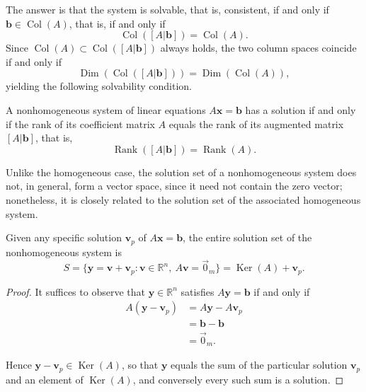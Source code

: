 The answer is that the system is solvable, that is, consistent, if and only if $\mathbf{b} \in \operatorname{Col}(A)$, that is, if and only if
\[
\operatorname{Col}([A|\mathbf{b}]) = \operatorname{Col}(A).
\]
Since $\operatorname{Col}(A) \subset \operatorname{Col}([A|\mathbf{b}])$ always holds, the two column spaces coincide if and only if
\[
\operatorname{Dim}(\operatorname{Col}([A|\mathbf{b}])) = \operatorname{Dim}(\operatorname{Col}(A)),
\]
yielding the following solvability condition.

\begin{theorem}
A nonhomogeneous system of linear equations $A\mathbf{x} = \mathbf{b}$ has a solution if and only if the rank of its coefficient matrix $A$ equals the rank of its augmented matrix $[A|\mathbf{b}]$, that is,
\[
\operatorname{Rank}([A|\mathbf{b}]) = \operatorname{Rank}(A).
\]

\end{theorem}

Unlike the homogeneous case, the solution set of a nonhomogeneous system does not, in general, form a vector space, since it need not contain the zero vector; nonetheless, it is closely related to the solution set of the associated homogeneous system.

\begin{theorem}
Given any specific solution $\mathbf{v}_p$ of $A\mathbf{x} = \mathbf{b}$, the entire solution set of the nonhomogeneous system is
\[
S = \{ \mathbf{y} = \mathbf{v} + \mathbf{v}_p : \mathbf{v} \in \mathbb{R}^n, \ A\mathbf{v} = \vec{0}_m \} = \operatorname{Ker}(A) + \mathbf{v}_p.
\]

\end{theorem}

\begin{proof}
It suffices to observe that $\mathbf{y} \in \mathbb{R}^n$ satisfies $A\mathbf{y} = \mathbf{b}$ if and only if
\[
\begin{aligned}
A(\mathbf{y} - \mathbf{v}_p) &= A\mathbf{y} - A\mathbf{v}_p \\
&= \mathbf{b} - \mathbf{b} \\
&= \vec{0}_m.
\end{aligned}
\]

Hence $\mathbf{y} - \mathbf{v}_p \in \operatorname{Ker}(A)$, so that $\mathbf{y}$ equals the sum of the particular solution $\mathbf{v}_p$ and an element of $\operatorname{Ker}(A)$, and conversely every such sum is a solution.
\end{proof}


